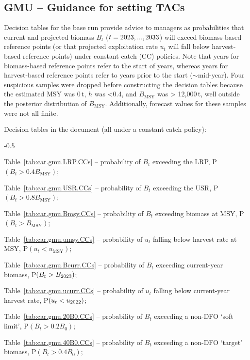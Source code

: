 \documentclass[11pt]{book}
\newcommand{\Bmsy}{B_\text{MSY}}
\newcommand{\umsy}{u_\text{MSY}}
\begin{document}
\subsection{GMU -- Guidance for setting TACs}

Decision tables for the base run provide advice to managers as probabilities that current and projected biomass $B_t$ ($t = 2023, ..., 2033$) will exceed biomass-based reference points (or that projected exploitation rate $u_t$ will fall below harvest-based reference points) under constant catch (CC) policies.
Note that years for biomass-based reference points refer to the start of years, whereas years for harvest-based reference points refer to years prior to the start ($\sim$mid-year).
Four suspicious samples were dropped before constructing the decision tables because the estimated MSY was 0\,t, $h$ was <0.4, and $\Bmsy$ was > 12,000\,t, well outside the posterior distribution of $\Bmsy$.
Additionally, forecast values for these samples were not all finite.

Decision tables in the document (all under a constant catch policy):
\begin{itemize_csas}{-0.5}{}
\item Table~\ref{tab:car.gmu.LRP.CCs} -- probability of $B_t$ exceeding the LRP, P$(B_t > 0.4 \Bmsy)$; %
\item Table~\ref{tab:car.gmu.USR.CCs} -- probability of $B_t$ exceeding the USR, P$(B_t > 0.8 \Bmsy)$; %
\item Table~\ref{tab:car.gmu.Bmsy.CCs} -- probability of $B_t$ exceeding biomass at MSY, P$(B_t > \Bmsy)$; %
\item Table~\ref{tab:car.gmu.umsy.CCs} -- probability of $u_t$ falling below harvest rate at MSY, P$(u_t < \umsy)$; %
\item Table~\ref{tab:car.gmu.Bcurr.CCs} -- probability of $B_t$ exceeding current-year biomass, P$(B_t > B_{2023})$; %
\item Table~\ref{tab:car.gmu.ucurr.CCs} -- probability of $u_t$ falling below current-year harvest rate, P$(u_t < u_{2022})$; %
\item Table~\ref{tab:car.gmu.20B0.CCs} -- probability of $B_t$ exceeding a non-DFO `soft limit', P$(B_t > 0.2 B_0)$; %
\item Table~\ref{tab:car.gmu.40B0.CCs} -- probability of $B_t$ exceeding a non-DFO `target' biomass, P$(B_t > 0.4 B_0)$; %
\end{itemize_csas}
\end{document}
